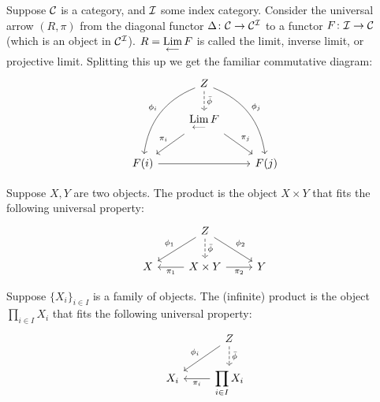 \begin{definition}
    Suppose \(\mathcal{C}\) is a category, and \(\mathcal{I}\) some index category.
    Consider the universal arrow \((R,\pi)\) from the diagonal functor \(\Delta\colon\mathcal{C}\to\mathcal{C}^{\mathcal{I}}\)
    to a functor \(F\colon\mathcal{I}\to\mathcal{C}\) (which is an object in \(\mathcal{C}^{\mathcal{I}}\)).
    \(R = \operatorname{\displaystyle\operatorname*{Lim}_{\longleftarrow}} F\) is called the limit, inverse limit, or projective limit.
    Splitting this up we get the familiar commutative diagram:
    \begin{equation*}
        \begin{tikzcd}
            & Z \arrow[dashrightarrow]{d}{\bar{\phi}} \arrow[bend right]{ddl}[swap]{\phi_i} \arrow[bend left]{ddr}{\phi_j} \\
            & \invLim F \arrow{dl}[swap]{\pi_i} \arrow{dr}{\pi_j} \\
            F(i) \arrow{rr} && F(j)
        \end{tikzcd}
    \end{equation*}
\end{definition}

\begin{definition}
    Suppose \(X,Y\) are two objects.
    The product is the object \(X \times Y\) that fits the following universal property:
    \begin{equation*}
        \begin{tikzcd}
            & Z \arrow{ld}[swap]{\phi_1} \arrow{rd}{\phi_2}
            \arrow[dashrightarrow]{d}{\bar{\phi}} \\
            X & X \times Y \arrow{l}{\pi_1} \arrow{r}[swap]{\pi_2} & Y
        \end{tikzcd}
    \end{equation*}
\end{definition}

\begin{definition}
    Suppose \({\{X_i\}}_{i \in I}\) is a family of objects.
    The (infinite) product is the object \(\prod_{i \in I} X_i\) that fits the following universal property:
    \begin{equation*}
        \begin{tikzcd}
            & Z \arrow{ld}[swap]{\phi_i}
            \arrow[dashrightarrow]{d}{\bar{\phi}} \\
            X_i & \displaystyle\prod_{i \in I} X_i \arrow{l}{\pi_i}
        \end{tikzcd}
    \end{equation*}
\end{definition}


